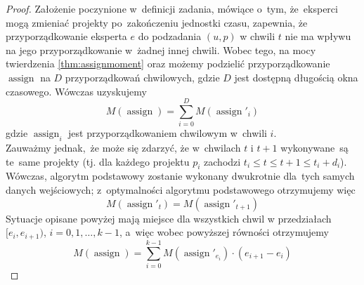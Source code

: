 \documentclass[12pt,a4paper]{article}
\theoremstyle{definition}
\DeclareMathOperator{\assign}{assign}
\begin{document}
\begin{proof}
Założenie poczynione w~definicji zadania, mówiące o~tym, że~eksperci mogą zmieniać projekty po~zakończeniu jednostki czasu, zapewnia, że przyporządkowanie eksperta $e$ do podzadania $(u, p)$ w chwili $t$ nie ma wpływu na jego przyporządkowanie w~żadnej innej chwili.
Wobec tego, na mocy twierdzenia \ref{thm:assignmoment} oraz możemy podzielić przyporządkowanie $\assign$ na $D$ przyporządkowań chwilowych, gdzie $D$ jest dostępną długością okna czasowego.
Wówczas uzyskujemy
$$ M(\assign) = \sum_{i=0}^{D} M(\assign'_i) $$
gdzie $\assign_i$ jest przyporządkowaniem chwilowym w~chwili $i$.\\

\noindent
Zauważmy jednak,~że może się zdarzyć, że w~chwilach $t$ i $t+1$ wykonywane~są te~same projekty (tj. dla każdego projektu $p_i$ zachodzi $t_i \leq t \leq t+1 \leq t_i + d_i$).
Wówczas, algorytm podstawowy zostanie wykonany dwukrotnie dla~tych samych danych wejściowych; z~optymalności algorytmu podstawowego otrzymujemy więc
$$ M(\assign'_t) = M(\assign'_{t+1}) $$
Sytuacje opisane powyżej mają miejsce dla wszystkich chwil w przedziałach $[e_i, e_{i+1})$, $i = 0, 1, \dots, k-1$,
a~więc wobec powyższej równości otrzymujemy
$$ M(\assign) = \sum_{i=0}^{k-1} M(\assign'_{e_i}) \cdot (e_{i+1} - e_i) $$
\end{proof}
\end{document}
